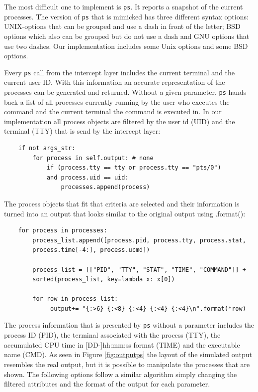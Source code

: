 The most difficult one to implement is \texttt{ps}. It reports a snapshot of the current processes.
The version of \texttt{ps} that is mimicked has three different syntax options: UNIX-options that can be grouped and use a dash in front of the letter; BSD options which also can be grouped but do not use a dash and GNU options that use two dashes\cite{noauthor_ps1_2024}.
Our implementation includes some Unix options and some BSD options. 

Every \texttt{ps} call from the intercept layer includes the current terminal and the current user ID. With this information an accurate representation of the processes can be generated and returned. Without a given parameter, \texttt{ps} hands back a list of all processes currently running by the user who executes the command and the current terminal the command is executed in\cite{noauthor_ps1_2024}. In our implementation all process objects are filtered by the user id (UID) and the terminal (TTY) that is send by the intercept layer:

\begin{lstlisting}
    if not args_str:
        for process in self.output: # none
            if (process.tty == tty or process.tty == "pts/0") 
            and process.uid == uid:
                processes.append(process)
\end{lstlisting}


The process objects that fit that criteria are selected and their information is turned into an output that looks similar to the original output using .format():

\begin{lstlisting}
    for process in processes:
        process_list.append([process.pid, process.tty, process.stat, 
        process.time[-4:], process.ucmd])

        process_list = [["PID", "TTY", "STAT", "TIME", "COMMAND"]] + 
        sorted(process_list, key=lambda x: x[0])

        for row in process_list:
             output+= "{:>6} {:<8} {:<4} {:<4} {:<4}\n".format(*row)
\end{lstlisting}

The process information that is presented by \texttt{ps} without a parameter includes the process ID (PID), the terminal associated with the process (TTY), the accumulated CPU time in [DD-]hh:mm:ss format (TIME) and the executable name (CMD)\cite{noauthor_ps1_2024}. As seen in Figure \ref{fig:outputps} the layout of the simulated output resembles the real output, but it is possible to manipulate the processes that are shown. The following options follow a similar algorithm simply changing the filtered attributes and the format of the output for each parameter. 


